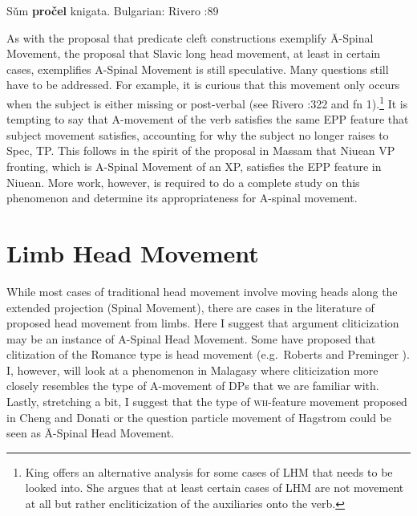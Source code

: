 \documentclass[output=paper,colorlinks,citecolor=brown,
]{langscibook}
\begin{document}
\ea
{}
\ex *S\v{u}m \textbf{pro\v{c}el} knigata. \hfill Bulgarian: Rivero \citeyear{Rivero:1994}:89

As with the proposal that predicate cleft constructions exemplify \=A-Spinal Movement, the proposal that Slavic long head movement, at least in certain cases, exemplifies A-Spinal Movement is still speculative.  Many questions still have to be addressed.  For example, it is curious that this movement only occurs when the subject is either missing or post-verbal (see Rivero \citeyear{Rivero:1994}:322 and fn 1).\footnote{King \citeyearpar{King:1996} offers an alternative analysis for some cases of LHM that needs to be looked into.  She argues that at least certain cases of LHM are not movement at all but rather encliticization of the auxiliaries onto the verb.}   It is tempting to say that A-movement of the verb satisfies the same EPP feature that subject movement satisfies, accounting for why the subject no longer raises to Spec, TP.  This follows in the spirit of the proposal in Massam \citeyearpar{Massam:2001a} that Niuean VP fronting, which is A-Spinal Movement of an XP, satisfies the EPP feature in Niuean.  More work, however, is required to do a complete study on this phenomenon and determine its appropriateness for A-spinal movement.

\section{Limb Head Movement}

 While most cases of traditional head movement involve moving heads along the extended projection (Spinal Movement), there are cases in the literature of proposed head movement from limbs.  Here I suggest that argument cliticization may be an instance of A-Spinal Head Movement.  Some have proposed that clitization of the Romance type is head movement (e.g.\ Roberts \citeyearpar{Roberts:2010} and Preminger \citeyearpar{Preminger:2019}). I, however, will look at a phenomenon in Malagasy where cliticization more closely resembles the type of A-movement of DPs that we are familiar with.  Lastly, stretching a bit, I suggest that the type of \textsc{wh}-feature movement proposed in Cheng \citeyearpar{Cheng:2000b} and Donati \citeyearpar{Donati:2006} or the question particle movement of Hagstrom \citeyearpar{Hagstrom:2000} could be seen as \=A-Spinal Head Movement.
\end{document}
